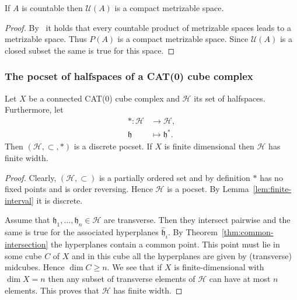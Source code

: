 \begin{cor}
  \label{cor:comp-met-2}
  If \(A\) is countable then \(\mathcal{U}(A)\) is a compact metrizable space. 
\end{cor}

\begin{proof}
  By~\textcite[Theorem~4.2.2]{Engelking} it holds that every countable product of metrizable spaces leads to a metrizable space. Thus \(P(A)\) is a compact metrizable space. Since \(\mathcal{U}(A)\) is a closed subset the same is true for this space.
\end{proof}


\subsubsection*{The pocset of halfspaces of a CAT(0) cube complex}
\label{pocset-halfspaces}

\begin{prop}
  \label{prop:pocset-halfspaces}
  Let \(X\) be a connected CAT(0) cube complex and \(\mathcal{H}\) its set of halfspaces. Furthermore, let
  \begin{align*}
    \ast \colon \mathcal{H} &\to \mathcal{H},\\
    \mathfrak{h} & \mapsto \mathfrak{h}^\ast.
  \end{align*}
  Then \((\mathcal{H}, \subset, \ast)\) is a discrete pocset. If \(X\) is finite dimensional then \(\mathcal{H}\) has finite width.
\end{prop}

\begin{proof}
  Clearly, \((\mathcal{H}, \subset)\) is a partially ordered set and by definition \(\ast\) has no fixed points and is order reversing. Hence \(\mathcal{H}\) is a pocset. By Lemma~\ref{lem:finite-interval} it is discrete.

  Assume that \(\mathfrak{h}_1, \dots, \mathfrak{h}_n \in \mathcal{H}\) are transverse. Then they intersect pairwise and the same is true for the associated hyperplanes \(\mathfrak{\hat h}_i\). By Theorem~\ref{thm:common-intersection} the hyperplanes contain a common point. This point must lie in some cube \(C\) of \(X\) and in this cube all the hyperplanes are given by (transverse) midcubes. Hence \(\dim C \geq n\). We see that if \(X\) is finite-dimensional with \(\dim X = n\) then any subset of transverse elements of \(\mathcal{H}\) can have at most \(n\) elements. This proves that \(\mathcal{H}\) has finite width.
\end{proof}

